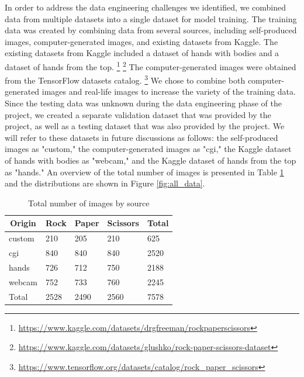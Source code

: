 \documentclass[a4paper]{article}
\begin{document}
In order to address the data engineering challenges we identified, we combined data from multiple datasets into a single dataset for model training. The training data was created by combining data from several sources, including self-produced images, computer-generated images, and existing datasets from Kaggle. The existing datasets from Kaggle included a dataset of hands with bodies and a dataset of hands from the top. \footnote{\url{https://www.kaggle.com/datasets/drgfreeman/rockpaperscissors}} \footnote{\url{https://www.kaggle.com/datasets/glushko/rock-paper-scissors-dataset}} The computer-generated images were obtained from the TensorFlow datasets catalog. \footnote{\url{https://www.tensorflow.org/datasets/catalog/rock_paper_scissors}} We chose to combine both computer-generated images and real-life images to increase the variety of the training data. Since the testing data was unknown during the data engineering phase of the project, we created a separate validation dataset that was provided by the project, as well as a testing dataset that was also provided by the project. We will refer to these datasets in future discussions as follows: the self-produced images as "custom," the computer-generated images as "cgi," the Kaggle dataset of hands with bodies as "webcam," and the Kaggle dataset of hands from the top as "hands." An overview of the total number of images is presented in Table \ref{tbl:img-origin} and the distributions are shown in Figure \ref{fig:all_data}.


\begin{table}
\label{tbl:img-origin}
\caption{Total number of images by source}
\centering
\begin{tabular}{@{}lllll@{}}
\toprule
\multicolumn{1}{c}{Origin} & Rock & Paper & Scissors & Total \\ \midrule
custom                     & 210  & 205   & 210      & 625   \\
cgi                        & 840  & 840   & 840      & 2520  \\
hands                      & 726  & 712   & 750      & 2188  \\
webcam                     & 752  & 733   & 760      & 2245  \\
Total                      & 2528 & 2490  & 2560     & 7578  \\ \bottomrule
\end{tabular}
\end{table}
\end{document}
